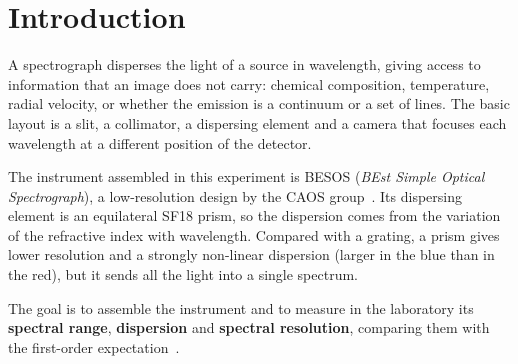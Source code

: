 \section{Introduction}

A spectrograph disperses the light of a source in wavelength, giving access to information that an image does not carry: chemical composition, temperature, radial velocity, or whether the emission is a continuum or a set of lines. The basic layout is a slit, a collimator, a dispersing element and a camera that focuses each wavelength at a different position of the detector.

The instrument assembled in this experiment is BESOS (\emph{BEst Simple Optical Spectrograph}), a low-resolution design by the CAOS group~\cite{besos}. Its dispersing element is an equilateral SF18 prism, so the dispersion comes from the variation of the refractive index with wavelength. Compared with a grating, a prism gives lower resolution and a strongly non-linear dispersion (larger in the blue than in the red), but it sends all the light into a single spectrum.

The goal is to assemble the instrument and to measure in the laboratory its \textbf{spectral range}, \textbf{dispersion} and \textbf{spectral resolution}, comparing them with the first-order expectation~\cite{guide}.
